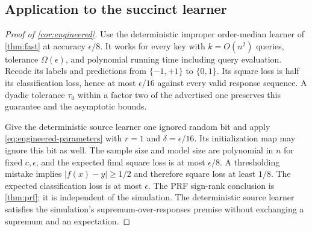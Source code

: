 \subsection{Application to the succinct learner}\label{proof:engineered}
\begin{proof}[Proof of \cref{cor:engineered}]
Use the deterministic improper order-median learner of \cref{thm:fast} at accuracy $\epsilon/8$. It works for every key with $k=O(n^2)$ queries, tolerance $\Omega(\epsilon)$, and polynomial running time including query evaluation. Recode its labels and predictions from $\{-1,+1\}$ to $\{0,1\}$. Its square loss is half its classification loss, hence at most $\epsilon/16$ against every valid response sequence. A dyadic tolerance $\tau_0$ within a factor two of the advertised one preserves this guarantee and the asymptotic bounds.

Give the deterministic source learner one ignored random bit and apply \eqref{eq:engineered-parameters} with $r=1$ and $\delta=\epsilon/16$. Its initialization map may ignore this bit as well. The sample size and model size are polynomial in $n$ for fixed $c,\epsilon$, and the expected final square loss is at most $\epsilon/8$. A thresholding mistake implies $|f(x)-y|\ge1/2$ and therefore square loss at least $1/8$. The expected classification loss is at most $\epsilon$. The PRF sign-rank conclusion is \cref{thm:prf}; it is independent of the simulation. The deterministic source learner satisfies the simulation's supremum-over-responses premise without exchanging a supremum and an expectation.
\end{proof}